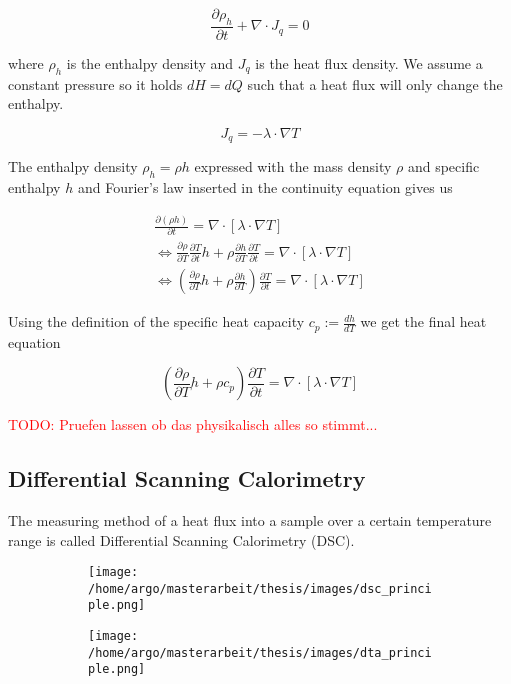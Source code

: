\documentclass{scrartcl}[12pt, halfparskip]
\newcommand{\todo}[1]{\textcolor{red}{TODO: #1}}
\begin{document}
\begin{equation}
	\frac{\partial \rho_h}{\partial t} + \nabla \cdot J_q = 0
\end{equation}

where $\rho_h$ is the enthalpy density and $J_q$ is the heat flux density. We assume a constant pressure so it holds $dH = dQ$ such that a heat flux will only change the enthalpy.

\begin{equation}
	J_q = - \lambda \cdot \nabla T
	\label{eq:fouriers_law}
\end{equation}

The enthalpy density $\rho_h = \rho h$ expressed with the mass density $\rho$ and specific enthalpy $h$ and Fourier's law inserted in the continuity equation gives us

\begin{align}
	\frac{\partial (\rho h)}{\partial t} = \nabla \cdot \left[\lambda \cdot \nabla T\right] \\
	\Leftrightarrow \frac{\partial \rho}{\partial T} \frac{\partial T}{\partial t} h + \rho \frac{\partial h}{\partial T} \frac{\partial T}{\partial t} = \nabla \cdot \left[\lambda \cdot \nabla T\right] \\
	\Leftrightarrow \left( \frac{\partial \rho}{\partial T} h + \rho \frac{\partial h}{\partial T} \right) \frac{\partial T}{\partial t} = \nabla \cdot \left[\lambda \cdot \nabla T\right]
\end{align}

Using the definition of the specific heat capacity $c_p := \frac{dh}{dT}$ we get the final heat equation

\begin{equation}
	\left( \frac{\partial \rho}{\partial T} h + \rho c_p \right) \frac{\partial T}{\partial t} = \nabla \cdot \left[\lambda \cdot \nabla T\right]
\end{equation}

\todo{Pruefen lassen ob das physikalisch alles so stimmt...}



\subsection{Differential Scanning Calorimetry}
\label{sec:physics_DSC}
The measuring method of a heat flux into a sample over a certain temperature range is called Differential Scanning Calorimetry (DSC). 

\begin{figure}[H]
	\centering
	\begin{subfigure}{0.49\textwidth}
		\texttt{[image: /home/argo/masterarbeit/thesis/images/dsc\_principle.png]}
		\caption{}
		\label{fig:DSC_power_compensated_principle}
	\end{subfigure}
	\begin{subfigure}{0.49\textwidth}
		\texttt{[image: /home/argo/masterarbeit/thesis/images/dta\_principle.png]}
		\caption{}
		\label{fig:DTA_principle}
	\end{subfigure}
	\caption{}
\end{figure}
\end{document}
